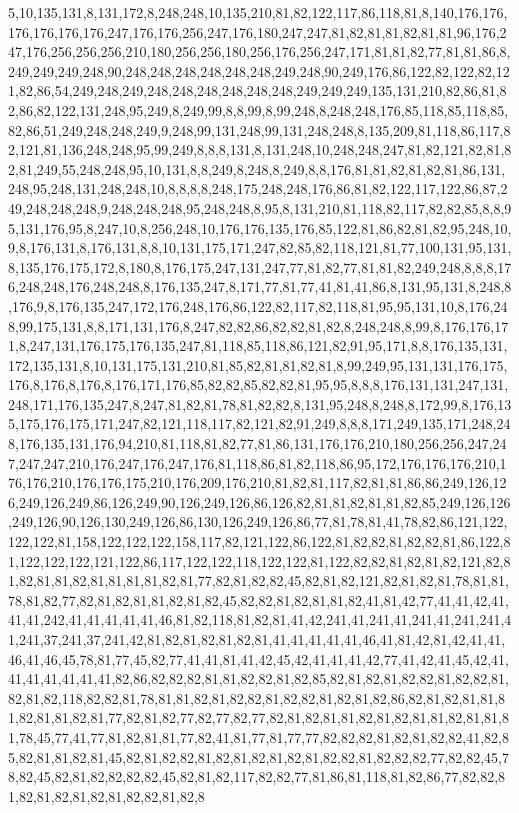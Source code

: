 5,10,135,131,8,131,172,8,248,248,10,135,210,81,82,122,117,86,118,81,8,140,176,176,176,176,176,176,247,176,176,256,247,176,180,247,247,81,82,81,81,82,81,81,96,176,247,176,256,256,256,210,180,256,256,180,256,176,256,247,171,81,81,82,77,81,81,86,8,249,249,249,248,90,248,248,248,248,248,248,249,248,90,249,176,86,122,82,122,82,121,82,86,54,249,248,249,248,248,248,248,248,248,249,249,249,135,131,210,82,86,81,82,86,82,122,131,248,95,249,8,249,99,8,8,99,8,99,248,8,248,248,176,85,118,85,118,85,82,86,51,249,248,248,249,9,248,99,131,248,99,131,248,248,8,135,209,81,118,86,117,82,121,81,136,248,248,95,99,249,8,8,8,131,8,131,248,10,248,248,247,81,82,121,82,81,82,81,249,55,248,248,95,10,131,8,8,249,8,248,8,249,8,8,176,81,81,82,81,82,81,86,131,248,95,248,131,248,248,10,8,8,8,8,248,175,248,248,176,86,81,82,122,117,122,86,87,249,248,248,248,9,248,248,248,95,248,248,8,95,8,131,210,81,118,82,117,82,82,85,8,8,95,131,176,95,8,247,10,8,256,248,10,176,176,135,176,85,122,81,86,82,81,82,95,248,10,9,8,176,131,8,176,131,8,8,10,131,175,171,247,82,85,82,118,121,81,77,100,131,95,131,8,135,176,175,172,8,180,8,176,175,247,131,247,77,81,82,77,81,81,82,249,248,8,8,8,176,248,248,176,248,248,8,176,135,247,8,171,77,81,77,41,81,41,86,8,131,95,131,8,248,8,176,9,8,176,135,247,172,176,248,176,86,122,82,117,82,118,81,95,95,131,10,8,176,248,99,175,131,8,8,171,131,176,8,247,82,82,86,82,82,81,82,8,248,248,8,99,8,176,176,171,8,247,131,176,175,176,135,247,81,118,85,118,86,121,82,91,95,171,8,8,176,135,131,172,135,131,8,10,131,175,131,210,81,85,82,81,81,82,81,8,99,249,95,131,131,176,175,176,8,176,8,176,8,176,171,176,85,82,82,85,82,82,81,95,95,8,8,8,176,131,131,247,131,248,171,176,135,247,8,247,81,82,81,78,81,82,82,8,131,95,248,8,248,8,172,99,8,176,135,175,176,175,171,247,82,121,118,117,82,121,82,91,249,8,8,8,171,249,135,171,248,248,176,135,131,176,94,210,81,118,81,82,77,81,86,131,176,176,210,180,256,256,247,247,247,247,210,176,247,176,247,176,81,118,86,81,82,118,86,95,172,176,176,176,210,176,176,210,176,176,175,210,176,209,176,210,81,82,81,117,82,81,81,86,86,249,126,126,249,126,249,86,126,249,90,126,249,126,86,126,82,81,81,82,81,81,82,85,249,126,126,249,126,90,126,130,249,126,86,130,126,249,126,86,77,81,78,81,41,78,82,86,121,122,122,122,81,158,122,122,122,158,117,82,121,122,86,122,81,82,82,81,82,82,81,86,122,81,122,122,122,121,122,86,117,122,122,118,122,122,81,122,82,82,81,82,81,82,121,82,81,82,81,81,82,81,81,81,81,82,81,77,82,81,82,82,45,82,81,82,121,82,81,82,81,78,81,81,78,81,82,77,82,81,82,81,81,82,81,82,45,82,82,81,82,81,81,82,41,81,42,77,41,41,42,41,41,41,242,41,41,41,41,41,46,81,82,118,81,82,81,41,42,241,41,241,41,241,41,241,241,41,241,37,241,37,241,42,81,82,81,82,81,82,81,41,41,41,41,41,46,41,81,42,81,42,41,41,46,41,46,45,78,81,77,45,82,77,41,41,81,41,42,45,42,41,41,41,42,77,41,42,41,45,42,41,41,41,41,41,41,41,82,86,82,82,82,81,81,82,82,81,82,85,82,81,82,81,82,82,81,82,82,81,82,81,82,118,82,82,81,78,81,81,82,81,82,82,81,82,82,81,82,81,82,86,82,81,82,81,81,81,82,81,81,82,81,77,82,81,82,77,82,77,82,77,82,81,82,81,81,82,81,82,81,81,82,81,81,81,78,45,77,41,77,81,82,81,81,77,82,41,81,77,81,77,77,82,82,82,81,82,81,82,82,41,82,85,82,81,81,82,81,45,82,81,82,82,81,82,81,82,81,82,81,82,82,81,82,82,82,77,82,82,45,78,82,45,82,81,82,82,82,82,45,82,81,82,117,82,82,77,81,86,81,118,81,82,86,77,82,82,81,82,81,82,81,82,81,82,82,81,82,8